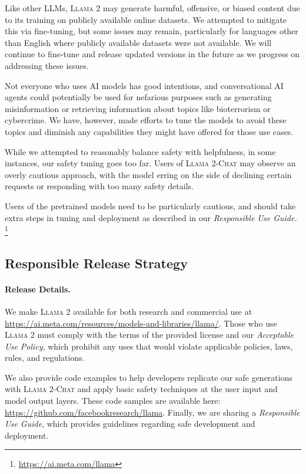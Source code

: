 Like other LLMs, \textsc{Llama 2} may generate harmful, offensive, or biased content due to its training on publicly available online datasets. We attempted to mitigate this via fine-tuning, but some issues may remain, particularly for languages other than English where publicly available datasets were not available. We will continue to fine-tune and release updated versions in the future as we progress on addressing these issues.

Not everyone who uses AI models has good intentions, and conversational AI agents could potentially be used for nefarious purposes such as generating misinformation or retrieving information about topics like bioterrorism or cybercrime.  We have, however, made efforts to tune the models to avoid these topics and diminish any capabilities they might have offered for those use cases. 

While we attempted to reasonably balance safety with helpfulness, in some instances, our safety tuning goes too far. Users of \textsc{Llama 2-Chat} may observe an overly cautious approach, with the model erring on the side of declining certain requests or responding with too many safety details. 

Users of the pretrained models need to be particularly cautious, and should take extra steps in tuning and deployment as described in our \textit{Responsible Use Guide.} \footnote{\url{https://ai.meta.com/llama}}

\subsection{Responsible Release Strategy}
\label{sec:responsible_release_strategy}
\paragraph{Release Details.} We make \textsc{Llama 2} available for both research and commercial use at \url{https://ai.meta.com/resources/models-and-libraries/llama/}. Those who use \textsc{Llama 2} must comply with the terms of the provided license and our \textit{Acceptable Use Policy}, which prohibit any uses that would violate applicable policies, laws, rules, and regulations.

We also provide code examples to help developers replicate our safe generations with \textsc{Llama 2-Chat} and apply basic safety techniques at the user input and model output layers. These code samples are available here: \url{https://github.com/facebookresearch/llama}. Finally, we are sharing a \textit{Responsible Use Guide}, which provides guidelines regarding safe development and deployment.

